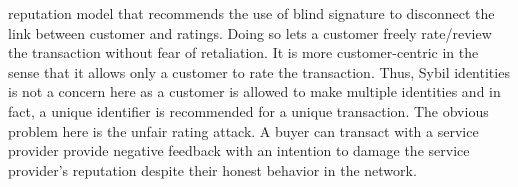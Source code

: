 reputation model that recommends the use of blind signature to disconnect
the link between customer and ratings. Doing so lets a customer freely
rate/review the transaction without fear of retaliation. It is more
customer-centric in the sense that it allows only a customer to rate the
transaction. Thus, Sybil identities is not a concern here as a customer is
allowed to make multiple identities and in fact, a unique identifier is
recommended for a unique transaction. The obvious problem here is the unfair
rating attack. A buyer can transact with a service provider provide negative
feedback with an intention to damage the service provider's reputation despite
their honest behavior in the network. 


%


